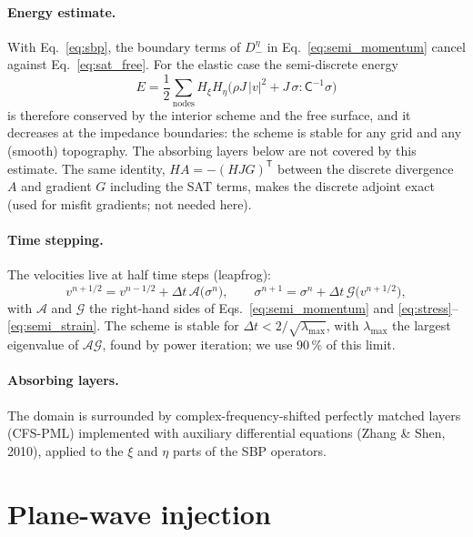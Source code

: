 \paragraph{Energy estimate.} With Eq.~\eqref{eq:sbp}, the boundary terms of $D_-^{\eta}$ in Eq.~\eqref{eq:semi_momentum}
cancel against Eq.~\eqref{eq:sat_free}. For the elastic case the semi-discrete energy
\begin{equation}
  E = \frac12 \sum_{\text{nodes}} H_\xi H_\eta \Big( \rho J\, |v|^2 + J\,\sigma : \mathsf{C}^{-1} \sigma \Big)
\end{equation}
is therefore conserved by the interior scheme and the free surface, and it decreases at the impedance boundaries: the
scheme is stable for any grid and any (smooth) topography. The absorbing layers below are not covered by this estimate. The same identity, $H A = -(H J G)^{\mathsf T}$ between the
discrete divergence $A$ and gradient $G$ including the SAT terms, makes the discrete adjoint exact (used for misfit
gradients; not needed here).

\paragraph{Time stepping.} The velocities live at half time steps (leapfrog):
\begin{equation}
  v^{n+1/2} = v^{n-1/2} + \Delta t\, \mathcal{A}\big(\sigma^{n}\big), \qquad
  \sigma^{n+1} = \sigma^{n} + \Delta t\, \mathcal{G}\big(v^{n+1/2}\big),
\end{equation}
with $\mathcal{A}$ and $\mathcal{G}$ the right-hand sides of Eqs.~\eqref{eq:semi_momentum} and
\eqref{eq:stress}--\eqref{eq:semi_strain}. The scheme is stable for $\Delta t < 2/\sqrt{\lambda_{\max}}$, with
$\lambda_{\max}$ the largest eigenvalue of $\mathcal{A}\mathcal{G}$, found by power iteration; we use 90\,\% of this limit.

\paragraph{Absorbing layers.} The domain is surrounded by complex-frequency-shifted perfectly matched layers (CFS-PML)
implemented with auxiliary differential equations (Zhang \& Shen, 2010), applied to the $\xi$ and $\eta$ parts of the SBP
operators.

\section{Plane-wave injection}\label{sec:injection}

